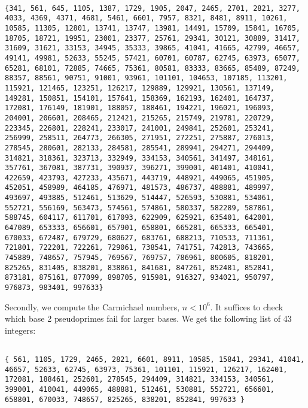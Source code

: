 \documentclass[10pt,a4paper]{report}
\begin{document}
\begin{lstlisting}[breaklines]

{341, 561, 645, 1105, 1387, 1729, 1905, 2047, 2465, 2701, 2821, 3277, 4033, 4369, 4371, 4681, 5461, 6601, 7957, 8321, 8481, 8911, 10261, 10585, 11305, 12801, 13741, 13747, 13981, 14491, 15709, 15841, 16705, 18705, 18721, 19951, 23001, 23377, 25761, 29341, 30121, 30889, 31417, 31609, 31621, 33153, 34945, 35333, 39865, 41041, 41665, 42799, 46657, 49141, 49981, 52633, 55245, 57421, 60701, 60787, 62745, 63973, 65077, 65281, 68101, 72885, 74665, 75361, 80581, 83333, 83665, 85489, 87249, 88357, 88561, 90751, 91001, 93961, 101101, 104653, 107185, 113201, 115921, 121465, 123251, 126217, 129889, 129921, 130561, 137149, 149281, 150851, 154101, 157641, 158369, 162193, 162401, 164737, 172081, 176149, 181901, 188057, 188461, 194221, 196021, 196093, 204001, 206601, 208465, 212421, 215265, 215749, 219781, 220729, 223345, 226801, 228241, 233017, 241001, 249841, 252601, 253241, 256999, 258511, 264773, 266305, 271951, 272251, 275887, 276013, 278545, 280601, 282133, 284581, 285541, 289941, 294271, 294409, 314821, 318361, 323713, 332949, 334153, 340561, 341497, 348161, 357761, 367081, 387731, 390937, 396271, 399001, 401401, 410041, 422659, 423793, 427233, 435671, 443719, 448921, 449065, 451905, 452051, 458989, 464185, 476971, 481573, 486737, 488881, 489997, 493697, 493885, 512461, 513629, 514447, 526593, 530881, 534061, 552721, 556169, 563473, 574561, 574861, 580337, 582289, 587861, 588745, 604117, 611701, 617093, 622909, 625921, 635401, 642001, 647089, 653333, 656601, 657901, 658801, 665281, 665333, 665401, 670033, 672487, 679729, 680627, 683761, 688213, 710533, 711361, 721801, 722201, 722261, 729061, 738541, 741751, 742813, 743665, 745889, 748657, 757945, 769567, 769757, 786961, 800605, 818201, 825265, 831405, 838201, 838861, 841681, 847261, 852481, 852841, 873181, 875161, 877099, 898705, 915981, 916327, 934021, 950797, 976873, 983401, 997633}

\end{lstlisting}

Secondly, we compute the Carmichael numbers, $n < 10^6$.  It suffices to check which base 2 pseudoprimes fail for larger bases. We get the following list of 43 integers: 

\begin{lstlisting}[breaklines]

{ 561, 1105, 1729, 2465, 2821, 6601, 8911, 10585, 15841, 29341, 41041, 46657, 52633, 62745, 63973, 75361, 101101, 115921, 126217, 162401, 172081, 188461, 252601, 278545, 294409, 314821, 334153, 340561, 399001, 410041, 449065, 488881, 512461, 530881, 552721, 656601, 658801, 670033, 748657, 825265, 838201, 852841, 997633 }

\end{lstlisting}
\end{document}
